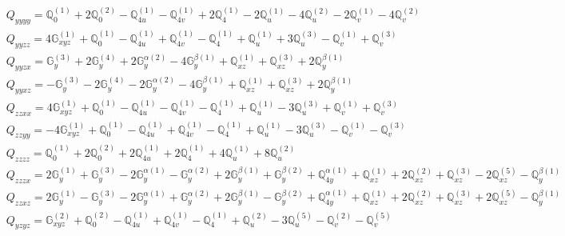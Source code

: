 \documentclass[fleqn,8pt,landscape]{jsarticle}
\begin{document}
\begin{align*}
& Q_{yyyy} = \mathbb{Q}_{0}^{(1)} + 2 \mathbb{Q}_{0}^{(2)} - \mathbb{Q}_{4u}^{(1)} - \mathbb{Q}_{4v}^{(1)} + 2 \mathbb{Q}_{4}^{(1)} - 2 \mathbb{Q}_{u}^{(1)} - 4 \mathbb{Q}_{u}^{(2)} - 2 \mathbb{Q}_{v}^{(1)} - 4 \mathbb{Q}_{v}^{(2)} \\
& Q_{yyzz} = 4 \mathbb{G}_{xyz}^{(1)} + \mathbb{Q}_{0}^{(1)} - \mathbb{Q}_{4u}^{(1)} + \mathbb{Q}_{4v}^{(1)} - \mathbb{Q}_{4}^{(1)} + \mathbb{Q}_{u}^{(1)} + 3 \mathbb{Q}_{u}^{(3)} - \mathbb{Q}_{v}^{(1)} + \mathbb{Q}_{v}^{(3)} \\
& Q_{yyzx} = \mathbb{G}_{y}^{(3)} + 2 \mathbb{G}_{y}^{(4)} + 2 \mathbb{G}_{y}^{\alpha(2)} - 4 \mathbb{G}_{y}^{\beta(1)} + \mathbb{Q}_{xz}^{(1)} + \mathbb{Q}_{xz}^{(3)} + 2 \mathbb{Q}_{y}^{\beta(1)} \\
& Q_{yyxz} = - \mathbb{G}_{y}^{(3)} - 2 \mathbb{G}_{y}^{(4)} - 2 \mathbb{G}_{y}^{\alpha(2)} - 4 \mathbb{G}_{y}^{\beta(1)} + \mathbb{Q}_{xz}^{(1)} + \mathbb{Q}_{xz}^{(3)} + 2 \mathbb{Q}_{y}^{\beta(1)} \\
& Q_{zzxx} = 4 \mathbb{G}_{xyz}^{(1)} + \mathbb{Q}_{0}^{(1)} - \mathbb{Q}_{4u}^{(1)} - \mathbb{Q}_{4v}^{(1)} - \mathbb{Q}_{4}^{(1)} + \mathbb{Q}_{u}^{(1)} - 3 \mathbb{Q}_{u}^{(3)} + \mathbb{Q}_{v}^{(1)} + \mathbb{Q}_{v}^{(3)} \\
& Q_{zzyy} = - 4 \mathbb{G}_{xyz}^{(1)} + \mathbb{Q}_{0}^{(1)} - \mathbb{Q}_{4u}^{(1)} + \mathbb{Q}_{4v}^{(1)} - \mathbb{Q}_{4}^{(1)} + \mathbb{Q}_{u}^{(1)} - 3 \mathbb{Q}_{u}^{(3)} - \mathbb{Q}_{v}^{(1)} - \mathbb{Q}_{v}^{(3)} \\
& Q_{zzzz} = \mathbb{Q}_{0}^{(1)} + 2 \mathbb{Q}_{0}^{(2)} + 2 \mathbb{Q}_{4u}^{(1)} + 2 \mathbb{Q}_{4}^{(1)} + 4 \mathbb{Q}_{u}^{(1)} + 8 \mathbb{Q}_{u}^{(2)} \\
& Q_{zzzx} = 2 \mathbb{G}_{y}^{(1)} + \mathbb{G}_{y}^{(3)} - 2 \mathbb{G}_{y}^{\alpha(1)} - \mathbb{G}_{y}^{\alpha(2)} + 2 \mathbb{G}_{y}^{\beta(1)} + \mathbb{G}_{y}^{\beta(2)} + \mathbb{Q}_{4y}^{\alpha(1)} + \mathbb{Q}_{xz}^{(1)} + 2 \mathbb{Q}_{xz}^{(2)} + \mathbb{Q}_{xz}^{(3)} - 2 \mathbb{Q}_{xz}^{(5)} - \mathbb{Q}_{y}^{\beta(1)} \\
& Q_{zzxz} = 2 \mathbb{G}_{y}^{(1)} - \mathbb{G}_{y}^{(3)} - 2 \mathbb{G}_{y}^{\alpha(1)} + \mathbb{G}_{y}^{\alpha(2)} + 2 \mathbb{G}_{y}^{\beta(1)} - \mathbb{G}_{y}^{\beta(2)} + \mathbb{Q}_{4y}^{\alpha(1)} + \mathbb{Q}_{xz}^{(1)} + 2 \mathbb{Q}_{xz}^{(2)} + \mathbb{Q}_{xz}^{(3)} + 2 \mathbb{Q}_{xz}^{(5)} - \mathbb{Q}_{y}^{\beta(1)} \\
& Q_{yzyz} = \mathbb{G}_{xyz}^{(2)} + \mathbb{Q}_{0}^{(2)} - \mathbb{Q}_{4u}^{(1)} + \mathbb{Q}_{4v}^{(1)} - \mathbb{Q}_{4}^{(1)} + \mathbb{Q}_{u}^{(2)} - 3 \mathbb{Q}_{u}^{(5)} - \mathbb{Q}_{v}^{(2)} - \mathbb{Q}_{v}^{(5)} \\

\end{align*}
\end{document}
